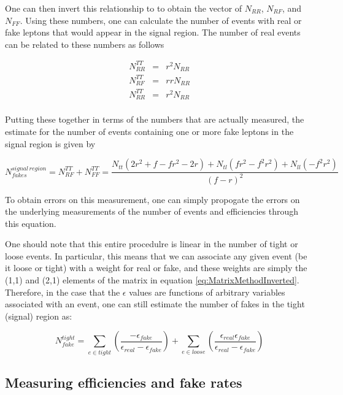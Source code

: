 One can then invert this relationship to to obtain the vector of $N_{RR}$, $N_{RF}$, and $N_{FF}$.
Using these numbers, one can calculate the number of events with real or fake leptons that would appear in the signal region.
The number of real events can be related to these numbers as follows

\begin{eqnarray*}
  N_{RR}^{TT} & = & r^2 N_{RR} \\
  N_{RF}^{TT} & = & r r N_{RR} \\
  N_{RR}^{TT} & = & r^2 N_{RR} \\
\end{eqnarray*}

Putting these together in terms of the numbers that are actually measured, the estimate for the number of events containing one or more fake leptons in the signal region is given by

\begin{equation}
N_{fakes}^{signal \, region} =  N_{RF}^{TT} + N_{FF}^{TT} = \frac{ N_{tt}(2r^2 + f - fr^2-2r) + N_{tl}(fr^2-f^2r^2) + N_{ll}(-f^2r^2) }{(f-r)^2} 
\end{equation}

To obtain errors on this measurement, one can simply propogate the errors on the underlying measurements of the number of events and efficiencies through this equation.

One should note that this entire procedulre is linear in the number of tight or loose events.
In particular, this means that we can associate any given event (be it loose or tight) with a weight for real or fake, and these weights are simply the (1,1) and (2,1) elements of the matrix in equation \ref{eq:MatrixMethodInverted}.
Therefore, in the case that the $\epsilon$ values are functions of arbitrary variables associated with an event, one can still estimate the number of fakes in the tight (signal) region as:

\begin{equation}
  N^{tight}_{fake} = \sum_{e \in tight} (\frac{-\epsilon_{fake}}{\epsilon_{real} - \epsilon_{fake}}) + \sum_{e \in loose} (\frac{\epsilon_{real}\epsilon_{fake}}{\epsilon_{real} - \epsilon_{fake}})
  \label{eq:MatrixMethodSum}
\end{equation}

\subsection{Measuring efficiencies and fake rates}

